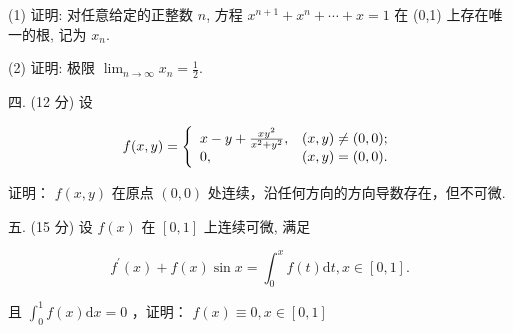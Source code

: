 \documentclass{examcollection}
\renewcommand{\displayformula}[1]{\[#1\]}
\begin{document}
{\begin{minipage}{\textwidth}
(1) 证明: 对任意给定的正整数 $n$, 方程 $x^{n+1} + x^n + \cdots + x = 1$ 在 (0,1) 上存在唯一的根, 记为 $x_n$.\par
(2) 证明: 极限 $\lim_{n\to \infty}x_n = \frac{1}{2}$.\par
四. (12 分) 设\par
\displayformula{f (x, y) = \left\{ \begin{array}{l l} x - y + \frac {x y ^ {2}}{x ^ {2} + y ^ {2}}, & (x, y) \neq (0, 0); \\ 0, & (x, y) = (0, 0). \end{array} \right.}\par
证明： $f(x,y)$ 在原点 $(0,0)$ 处连续，沿任何方向的方向导数存在，但不可微.\par
五. (15 分) 设 $f(x)$ 在 $[0, 1]$ 上连续可微, 满足\par
\displayformula{f ^ {\prime} (x) + f (x) \sin x = \int_ {0} ^ {x} f (t) \mathrm{d} t, x \in [ 0, 1 ].}\par
且 $\int_0^1 f(x)\mathrm{d}x = 0$ ，证明： $f(x)\equiv 0,x\in [0,1]$\par
\end{minipage}}
\ifdim\dimexpr\ht\proofbox+\dp\proofbox\relax>\textheight
\noindent\resizebox{!}{\textheight}{\usebox{\proofbox}}\else\noindent\usebox{\proofbox}\fi\clearpage
\end{document}

